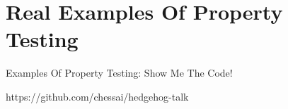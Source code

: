 \section{Real Examples Of Property Testing}

  \frame{\sectionpage}
  
  \begin{frame}{Examples Of Property Testing: Show Me The Code!}
     \begin{center} 
     https://github.com/chessai/hedgehog-talk 
     \end{center}
  \end{frame}